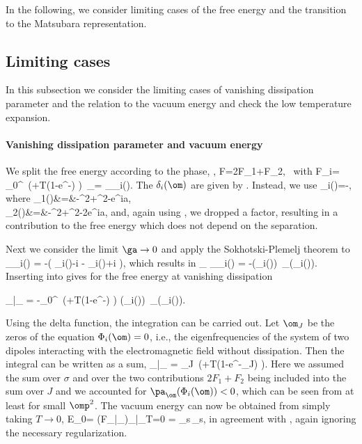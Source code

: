 \documentclass[notitlepage,prd,aps,longbibliography,twocolumn]{revtex4-1}
\begin{document}
In the following, we consider limiting cases of the free energy and the transition to the Matsubara representation.

%
\subsection{\label{T3.1}Limiting cases}
%
In this subsection we consider the limiting cases of vanishing dissipation parameter and the relation to the vacuum energy and check the low temperature expansion.

\paragraph{Vanishing dissipation parameter and vacuum energy} We split the free energy  according to the phase, ,
%
\be F=2F_1+F_2,\
\label{3.8a}\ee
%
with
%
\be
F_i= \int_0^\infty {}\,
\left(+T\ln\left(1-e^{-\beta\om}\right) \right)
\,\sum_{\sigma=} \pa_\om \delta_i(\om).
\label{3.8}\ee
%
The $\delta_i(\om)$ are given by . Instead, we use
%
\be \delta_i(\om)=-\ln{},
\label{3.9}\ee
%
where
%
\bea
\Phi_1(\om)&=&-\om^2+\Om^2-\sigma{}e^{i\om a}, \nn \\
\Phi_2(\om)&=&-\om^2+\Om^2-2\sigma\frac{e^2}{m a^3}e^{i\om a},
\label{3.10}\eea
%
and, again using , we dropped a factor, resulting in a contribution to the free energy which does not depend on the separation.

Next we consider the limit $\ga\to0$ and apply the Sokhotski-Plemelj theorem to
%
\be \pa_\om \delta_i(\om) = -\left(
  {\Phi_i(\om)-i\ga\om}
- {\Phi_i(\om)+i\ga\om} \right),
\label{3.11}\ee
%
which results in
%
\be \lim_{\ga{}} \pa_\om \delta_i(\om) =
-\pi\delta(\Phi_i(\om))\, \pa_\om (\Phi_i(\om)).
\label{3.12}\ee
%
Inserting into  gives for the free energy at vanishing dissipation
\begin{widetext}
%
_{|_{}} = -\int_0^\,
\left(+T\ln\left(1-e^{-\beta\om}\right) \right)
\delta(\Phi_i(\om))\, \pa_\om (\Phi_i(\om)).
\label{3.13}\ee
%
\end{widetext}
Using the delta function, the integration can be carried out. Let $\om_J$ be the zeros of the equation $\Phi_i(\om)=0$, i.e., the eigenfrequencies of the system of two dipoles interacting with the electromagnetic field without dissipation. Then the integral can be written as a sum,
%
_{|_{}} = \sum_J\,
\left(+T\ln\left(1-e^{-\beta\om_J}\right) \right).
\label{3.14}\ee
%
Here we assumed the sum over $\sigma$ and over the two contributions $2F_1+F_2$ being included into the sum over $J$ and we accounted for $\pa_\om (\Phi_i(\om))<0$, which can be seen from  at least for small $\omp^2$.
The vacuum energy can now be obtained from \Ref{3.14} simply taking $T\to0$,
%
\be E_0= \left({F}_{|_{}}\right)_{|_{T=0}} =  \sum_s\,\om_s,
\label{3.15}\ee
%
in agreement with , again ignoring the necessary regularization.
\end{document}
